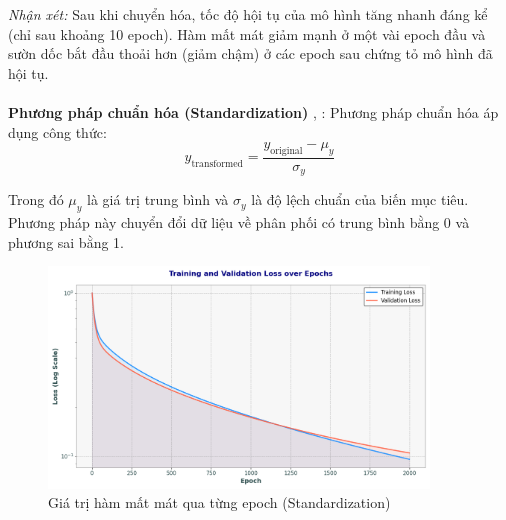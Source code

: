 \textit{Nhận xét:} Sau khi chuyển hóa, tốc độ hội tụ của mô hình tăng nhanh đáng kể (chỉ sau khoảng 10 epoch). Hàm mất mát giảm mạnh ở một vài epoch đầu và sườn dốc bắt đầu thoải hơn (giảm chậm) ở các epoch sau chứng tỏ mô hình đã hội tụ.

\paragraph{}{\textbf{Phương pháp chuẩn hóa (Standardization)} \cite{kaggle-standardization}, \cite{youtube-standardization-normalization}: }
Phương pháp chuẩn hóa áp dụng công thức:
\[
    y_{\text{transformed}} = \frac{y_{\text{original}} - \mu_{y}}{\sigma_{y}}
\]

Trong đó $\mu_{y}$ là giá trị trung bình và $\sigma_{y}$ là độ lệch chuẩn của biến mục tiêu. Phương pháp này chuyển đổi dữ liệu về phân phối có trung bình bằng 0 và phương sai bằng 1.

\begin{figure}[H]
    \centering
    \includegraphics[width=0.9\textwidth]{img_multiple/loss_standardization.png} %
    \caption{Giá trị hàm mất mát qua từng epoch (Standardization)}
    \label{fig:loss_standardization}
\end{figure}

